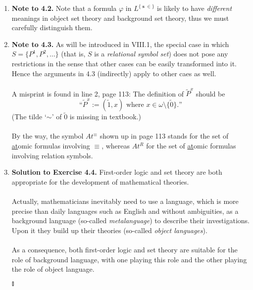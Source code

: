 \begin{enumerate}[1.]
\item \textbf{Note to 4.2.} Note that a formula $\varphi$ in $L^{\{ \mbfs{\in} \}}$ is likely to have \emph{different} meanings in object set theory and background set theory, thus we must carefully distinguish them.
\item \textbf{Note to 4.3.} As will be introduced in VIII.1, the special case in which $S = \{ P^1, P^2, \ldots \}$ (that is, $S$ is a \emph{relational symbol set}) does not pose any restrictions in the sense that other cases can be easily transformed into it. Hence the arguments in 4.3 (indirectly) apply to other caes as well.\\
\\
A misprint is found in line 2, page 113: The definition of $\tilde{P}^x$ should be
\[
\mbox{``$\tilde{P}^x := (\tilde{1}, x)$ where $x \in \omega \setminus \{ \tilde{0} \}$.''}
\]
(The tilde `$\sim$' of $\tilde{0}$ is missing in textbook.)\\
\\
By the way, the symbol $At^{\equiv}$ shown up in page 113 stands for the set of \underline{at}omic formulas involving $\equiv$, whereas $At^R$ for the set of \underline{at}omic formulas involving relation symbols.
%
\item \textbf{Solution to Exercise 4.4.} First-order logic and set theory are both appropriate for the development of mathematical theories.\\
\\
Actually, mathematicians inevitably need to use a language, which is more precise than daily languages such as English and without ambiguities, as a background language (so-called \textit{metalanguage}) to describe their investigations. Upon it they build up their theories (so-called \textit{object languages}).\\
\\
As a consequence, both first-order logic and set theory are suitable for the role of background language, with one playing this role and the other playing the role of object language. \begin{flushright}$\talloblong$\end{flushright}
\end{enumerate}

